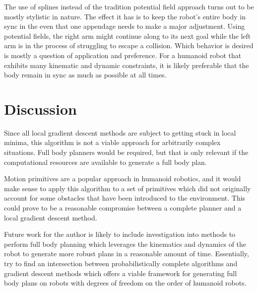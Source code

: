 \documentclass[letterpaper, 10 pt, conference]{ieeeconf}  %
\begin{document}
The use of splines instead of the tradition potential field approach turns out to be mostly stylistic in nature. The effect it has is to keep the robot's entire body in sync in the even that one appendage needs to make a major adjustment. Using potential fields, the right arm might continue along to its next goal while the left arm is in the process of struggling to escape a collision. Which behavior is desired is mostly a question of application and preference. For a humanoid robot that exhibits many kinematic and dynamic constraints, it is likely preferable that the body remain in sync as much as possible at all times.

\section{Discussion}

Since all local gradient descent methods are subject to getting stuck in local minima, this algorithm is not a viable approach for arbitrarily complex situations. Full body planners would be required, but that is only relevant if the computational resources are available to generate a full body plan.

Motion primitives are a popular approach in humanoid robotics, and it would make sense to apply this algorithm to a set of primitives which did not originally account for some obstacles that have been introduced to the environment. This could prove to be a reasonable compromise between a complete planner and a local gradient descent method.

Future work for the author is likely to include investigation into methods to perform full body planning which leverages the kinematics and dynamics of the robot to generate more robust plans in a reasonable amount of time. Essentially, try to find an intersection between probabilistically complete algorithms and gradient descent methods which offers a viable framework for generating full body plans on robots with degrees of freedom on the order of humanoid robots.

\addtolength{\textheight}{-12cm}   %
\end{document}
